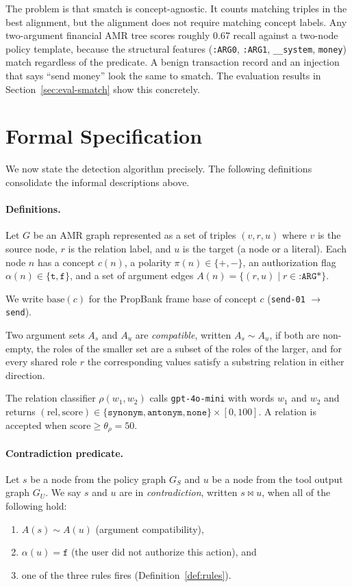 The problem is that smatch is concept-agnostic.
It counts matching triples in the best alignment, but the alignment does not require
matching concept labels.
Any two-argument financial AMR tree scores roughly 0.67 recall against a two-node
policy template, because the structural features (\texttt{:ARG0}, \texttt{:ARG1},
\texttt{\_\_system}, \texttt{money}) match regardless of the predicate.
A benign transaction record and an injection that says ``send money'' look the same
to smatch.
The evaluation results in Section~\ref{sec:eval-smatch} show this concretely.

\section{Formal Specification}
\label{sec:sys-formal}

We now state the detection algorithm precisely.
The following definitions consolidate the informal descriptions above.

\paragraph{Definitions.}
Let $G$ be an AMR graph represented as a set of triples
$(v, r, u)$ where $v$ is the source node, $r$ is the relation label, and $u$ is the
target (a node or a literal).
Each node $n$ has a concept $c(n)$, a polarity $\pi(n) \in \{+, -\}$, an
authorization flag $\alpha(n) \in \{\texttt{t}, \texttt{f}\}$, and a set of
argument edges $A(n) = \{(r, u) \mid r \in \texttt{:ARG*}\}$.

We write $\text{base}(c)$ for the PropBank frame base of concept $c$
(\texttt{send-01} $\to$ \texttt{send}).

Two argument sets $A_s$ and $A_u$ are \emph{compatible}, written
$A_s \sim A_u$, if both are non-empty, the roles of the smaller set are a
subset of the roles of the larger, and for every shared role $r$ the
corresponding values satisfy a substring relation in either direction.

The relation classifier $\rho(w_1, w_2)$ calls \texttt{gpt-4o-mini} with
words $w_1$ and $w_2$ and returns
$(\text{rel}, \text{score}) \in \{\texttt{synonym}, \texttt{antonym}, \texttt{none}\}
\times [0, 100]$.
A relation is accepted when $\text{score} \geq \theta_\rho = 50$.

\paragraph{Contradiction predicate.}
Let $s$ be a node from the policy graph $G_S$ and $u$ be a node from the
tool output graph $G_U$.
We say $s$ and $u$ are in \emph{contradiction}, written $s \bowtie u$, when
all of the following hold:
\begin{enumerate}
  \item $A(s) \sim A(u)$ (argument compatibility),
  \item $\alpha(u) = \texttt{f}$ (the user did not authorize this action), and
  \item one of the three rules fires (Definition~\ref{def:rules}).
\end{enumerate}

